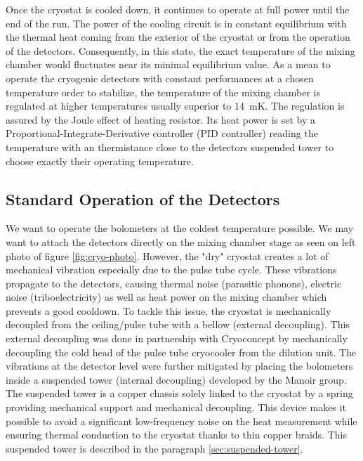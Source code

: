 Once the cryostat is cooled down, it continues to operate at full power until the end of the run. The power of the cooling circuit is in constant equilibrium with the thermal heat coming from the exterior of the cryostat or from the operation of the detectors. Consequently, in this state, the exact temperature of the mixing chamber would fluctuates near its minimal equilibrium value. 
As a mean to operate the cryogenic detectors with constant performances at a chosen temperature order to stabilize, the temperature of the mixing chamber is regulated at higher temperatures usually superior to \SI{14}{\milli\kelvin}. The regulation is assured by the Joule effect of heating resistor. Its heat power is set by a Proportional-Integrate-Derivative controller (PID controller) reading the temperature with an  thermistance close to the detectors suspended tower to choose exactly their operating temperature.


\subsection{Standard Operation of the Detectors}

We want to operate the bolometers at the coldest temperature possible. We may want to attach the detectors directly on the mixing chamber stage as seen on left photo of figure \ref{fig:cryo-photo}. However, the "dry" cryostat creates a lot of mechanical vibration especially due to the pulse tube cycle. These vibrations propagate to the detectors, causing thermal noise (parasitic phonons), electric noise (triboelectricity) as well as heat power on the mixing chamber which prevents a good cooldown.
To tackle this issue, the cryostat is mechanically decoupled from the ceiling/pulse tube with a bellow (external decoupling). This external decoupling was done in partnership with Cryoconcept by mechanically decoupling the cold head of the pulse tube cryocooler from the dilution unit. The vibrations at the detector level were further mitigated by placing the bolometers inside a suspended tower (internal decoupling) developed by the Manoir group.
The suspended tower is a copper chassis solely linked to the cryostat by a spring providing mechanical support and mechanical decoupling. This device makes it possible to avoid a significant low-frequency noise on the heat measurement while ensuring thermal conduction to the cryostat thanks to thin copper braids. This suspended tower is described in the paragraph \ref{sec:suspended-tower}.

